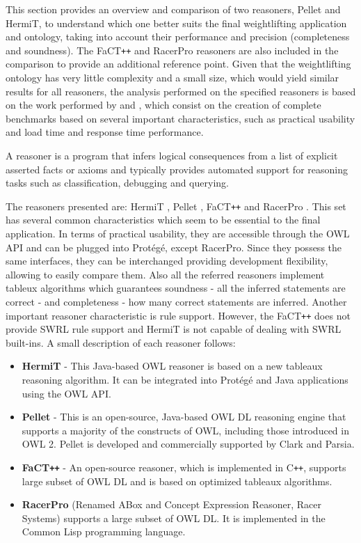 
This section provides an overview and comparison of two reasoners, Pellet and HermiT, to understand which one better suits the final weightlifting application and ontology, taking into account their performance and precision (completeness and soundness). The FaCT\texttt{++} and RacerPro reasoners are also included in the comparison to provide an additional reference point. Given that the weightlifting ontology has very little complexity and a small size, which would yield similar results for all reasoners, the analysis performed on the specified reasoners is based on the work performed by \cite{Dentler2011} and \cite{Bock2008}, which consist on the creation of complete benchmarks based on several important characteristics, such as practical usability and load time and response time performance.

A reasoner is a program that infers logical consequences from a list of explicit asserted facts or axioms and typically provides automated support for reasoning tasks such as classification, debugging and querying.

The reasoners presented are: HermiT \cite{1_hermitreasoner}, Pellet \cite{2_stardog-union/pellet_2016}, FaCT\texttt{++} \cite{3_fact++reasoner} and RacerPro \cite{4_racerpro_2016}. This set has several common characteristics which seem to be essential to the final application. In terms of practical usability, they are accessible through the OWL API and can be plugged into Protégé, except RacerPro. Since they possess the same interfaces, they can be interchanged providing development flexibility, allowing to easily compare them. Also all the referred reasoners implement tableux algorithms which guarantees soundness - all the inferred statements are correct - and completeness - how many correct statements are inferred. Another important reasoner characteristic is rule support. However, the FaCT\texttt{++} does not provide SWRL rule support and HermiT is not capable of dealing with SWRL built-ins. A small description of each reasoner follows:

\begin{itemize}
\item \textbf{HermiT} - This Java-based OWL reasoner is based on a new tableaux reasoning algorithm. It can be integrated into Protégé and Java applications using the OWL API.
\item \textbf{Pellet} - This is an open-source, Java-based OWL DL reasoning engine that supports a majority of the constructs of OWL, including those introduced in OWL 2. Pellet is developed and commercially supported by Clark and Parsia.
\item \textbf{FaCT\texttt{++}} - An open-source reasoner, which is implemented in C\texttt{++}, supports large subset of OWL DL and is based on optimized tableaux algorithms.
\item \textbf{RacerPro} (Renamed ABox and Concept Expression
Reasoner, Racer Systems) supports a large subset of OWL DL. It is implemented in the Common Lisp programming language.
\end{itemize}

